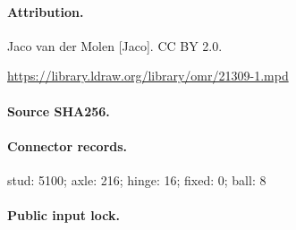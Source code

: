 \paragraph{Attribution.}Jaco van der Molen [Jaco]. CC BY 2.0.\par\url{https://library.ldraw.org/library/omr/21309-1.mpd}
\paragraph{Source SHA256.}
\paragraph{Connector records.}stud: 5100; axle: 216; hinge: 16; fixed: 0; ball: 8
\paragraph{Public input lock.}
